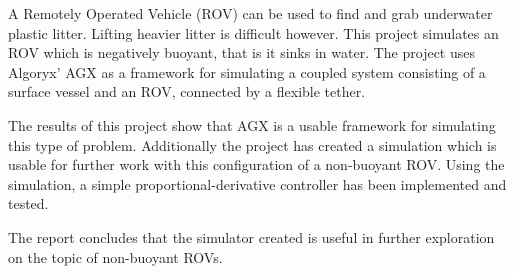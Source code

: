 A Remotely Operated Vehicle (ROV) can be used to find and grab underwater plastic litter. Lifting heavier litter is difficult however. This project simulates an ROV which is negatively buoyant, that is it sinks in water. The project uses Algoryx' AGX as a framework for simulating a coupled system consisting of a surface vessel and an ROV, connected by a flexible tether. 

The results of this project show that AGX is a usable framework for simulating this type of problem. Additionally the project has created a simulation which is usable for further work with this configuration of a non-buoyant ROV. Using the simulation, a simple proportional-derivative controller has been implemented and tested. 

The report concludes that the simulator created is useful in further exploration on the topic of non-buoyant ROVs. 









